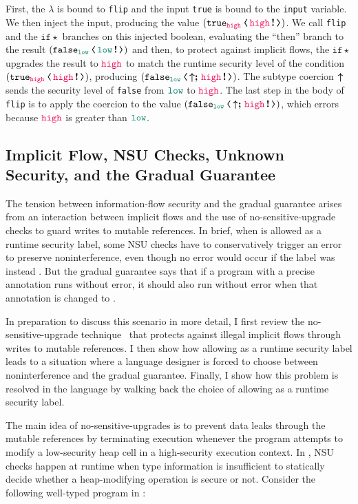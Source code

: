 First, the $\lambda$ is bound to \texttt{flip} and the input \texttt{true} is
bound to the \texttt{input} variable. We then inject the input, producing the
value $(\cccast{\true_{\high}}{\inj{\high}})$. We call \texttt{flip} and the
$\mathtt{if}\star$ branches on this injected boolean, evaluating the ``then''
branch to the result $(\cccast{\false_{\low}}{\inj{\low}})$ and then, to protect
against implicit flows, the $\mathtt{if}\star$ upgrades the result to $\high$ to
match the runtime security level of the condition
$(\cccast{\true_{\high}}{\inj{\high}})$, producing
$(\cccast{\false_{\low}}{\up\seq\inj{\high}})$. The subtype coercion $\boldsymbol{\uparrow}$ sends
the security level of \texttt{false} from $\low$ to $\high$. The last step in
the body of \texttt{flip} is to apply the coercion \texttt{} to
the value $(\cccast{\false_{\low}}{\up\seq\inj{\high}})$, which errors because
$\high$ is greater than $\low$.

\subsection{Implicit Flow, NSU Checks, Unknown Security, and the Gradual Guarantee}
\label{sec:example2}


The tension between information-flow security and the gradual guarantee arises
from an interaction between implicit flows and the use of no-sensitive-upgrade
checks to guard writes to mutable references. In brief, when \unk is allowed as
a runtime security label, some NSU checks have to conservatively trigger an
error to preserve noninterference, even though no error would occur if the label
was instead \high. But the gradual guarantee says that if a program with a
precise annotation runs without error, it should also run without error when
that annotation is changed to \unk.

In preparation to discuss this scenario in more detail, I first review the
no-sensitive-upgrade technique~\parencite{austin2009efficient} that protects against
illegal implicit flows through writes to mutable references. I then show how
allowing \unk as a runtime security label leads to a situation where a language
designer is forced to choose between noninterference and the gradual guarantee.
Finally, I show how this problem is resolved in the \Surface language by walking
back the choice of allowing \unk as a runtime security label.

The main idea of no-sensitive-upgrades is to prevent data leaks through the
mutable references by terminating execution whenever the program attempts to
modify a low-security heap cell in a high-security execution context. In
\Surface, NSU checks happen at runtime when type information is insufficient to
statically decide whether a heap-modifying operation is secure or not. Consider
the following well-typed program in \Surface:

